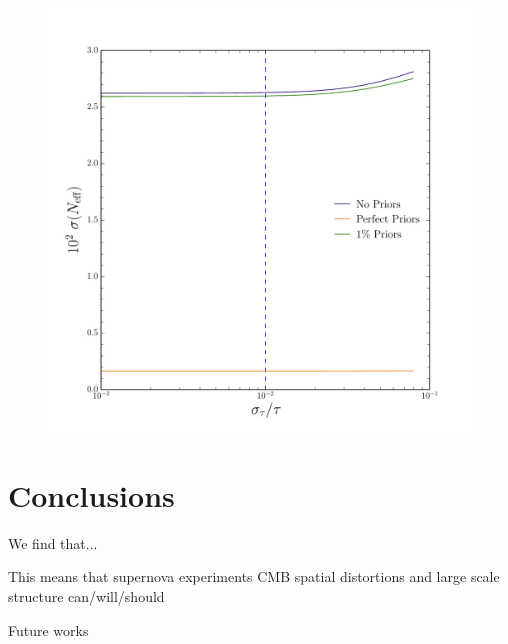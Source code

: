 \documentclass[aps,prd,preprint,groupedaddress]{revtex4-1}
\begin{document}
\begin{figure}[htbp]
\begin{center}
\includegraphics[scale=0.6]{tau_fisher.pdf}
\caption{}
\label{fig:phi-cl-noise}
\end{center}
\end{figure}



\section{Conclusions \label{sec:conclusions}}
We find that...

This means that supernova experiments CMB spatial distortions and large scale structure can/will/should

Future works


%
\end{document}
